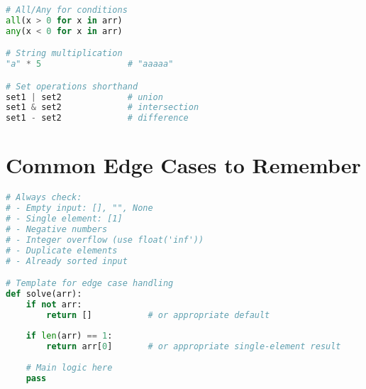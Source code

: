 \documentclass[9pt,a4paper]{article}
\begin{document}
\begin{multicols}{2}
\begin{lstlisting}[language=Python]
# All/Any for conditions
all(x > 0 for x in arr)
any(x < 0 for x in arr)

# String multiplication
"a" * 5                 # "aaaaa"

# Set operations shorthand
set1 | set2             # union
set1 & set2             # intersection
set1 - set2             # difference
\end{lstlisting}

\section*{Common Edge Cases to Remember}
\begin{lstlisting}[language=Python]
# Always check:
# - Empty input: [], "", None
# - Single element: [1]
# - Negative numbers
# - Integer overflow (use float('inf'))
# - Duplicate elements
# - Already sorted input

# Template for edge case handling
def solve(arr):
    if not arr:
        return []           # or appropriate default
    
    if len(arr) == 1:
        return arr[0]       # or appropriate single-element result
    
    # Main logic here
    pass
\end{lstlisting}

\end{multicols}
\end{document}
